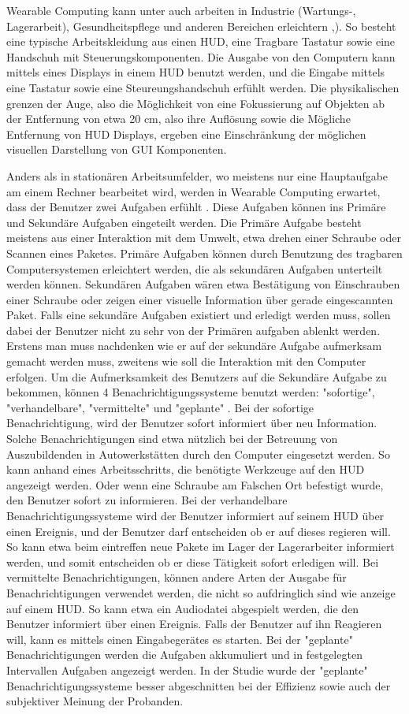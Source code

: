 Wearable Computing kann unter auch arbeiten in Industrie (Wartungs-, Lagerarbeit), Gesundheitspflege und anderen Bereichen erleichtern \cite{Witt:2006hi},\cite{Lawo:2008gg}). So besteht eine typische Arbeitskleidung aus einen HUD, eine Tragbare Tastatur sowie eine Handschuh mit Steuerungskomponenten. Die Ausgabe von den Computern kann mittels eines Displays in einem HUD benutzt werden, und die Eingabe mittels eine Tastatur sowie eine Steureungshandschuh erfühlt werden. Die physikalischen grenzen der Auge, also die Möglichkeit von eine Fokussierung auf Objekten ab der Entfernung von etwa 20 cm, also ihre Auflösung sowie die Mögliche Entfernung von HUD Displays, ergeben eine Einschränkung der möglichen visuellen Darstellung von GUI Komponenten. 

Anders als in stationären Arbeitsumfelder, wo meistens nur eine Hauptaufgabe am einem Rechner bearbeitet wird, werden in Wearable Computing erwartet, dass der Benutzer zwei Aufgaben erfühlt \cite{Witt:2006hi}. Diese Aufgaben können ins Primäre und Sekundäre Aufgaben eingeteilt werden. Die Primäre Aufgabe besteht meistens aus einer Interaktion mit dem Umwelt, etwa drehen einer Schraube oder Scannen eines Paketes. Primäre Aufgaben können durch Benutzung des tragbaren Computersystemen erleichtert werden, die als sekundären Aufgaben unterteilt werden können. Sekundären Aufgaben wären etwa Bestätigung von Einschrauben einer Schraube oder zeigen einer visuelle Information über gerade eingescannten Paket. Falls eine sekundäre Aufgaben existiert und erledigt werden muss, sollen dabei der Benutzer nicht zu sehr von der Primären aufgaben ablenkt werden. Erstens man muss nachdenken wie er auf der sekundäre Aufgabe aufmerksam gemacht werden muss, zweitens wie soll die Interaktion mit den Computer erfolgen. Um die Aufmerksamkeit des Benutzers auf die Sekundäre Aufgabe zu bekommen, können 4 Benachrichtigungssysteme benutzt werden: "sofortige", "verhandelbare", "vermittelte" und "geplante" \cite{McFarlane:1999um}\cite{Nilsson:cq}. Bei der sofortige Benachrichtigung, wird der Benutzer sofort informiert über neu Information. Solche Benachrichtigungen sind etwa nützlich bei der Betreuung von Auszubildenden in Autowerkstätten durch den Computer eingesetzt werden. So kann anhand eines Arbeitsschritts, die benötigte Werkzeuge auf den HUD angezeigt werden. Oder wenn eine Schraube am Falschen Ort befestigt wurde, den Benutzer sofort zu informieren. Bei der verhandelbare Benachrichtigungssysteme wird der Benutzer informiert auf seinem HUD über einen Ereignis, und der Benutzer darf entscheiden ob er auf dieses regieren will. So kann etwa beim eintreffen neue Pakete im Lager der Lagerarbeiter informiert werden, und somit entscheiden ob er diese Tätigkeit sofort erledigen will. Bei vermittelte Benachrichtigungen, können andere Arten der Ausgabe für Benachrichtigungen verwendet werden, die nicht so aufdringlich sind wie anzeige auf einem HUD. So kann etwa ein Audiodatei abgespielt werden, die den Benutzer informiert über einen Ereignis. Falls der Benutzer auf ihn Reagieren will, kann es mittels einen Eingabegerätes es starten. Bei der "geplante" Benachrichtigungen werden die Aufgaben  akkumuliert und in festgelegten Intervallen Aufgaben angezeigt werden. In der Studie \cite{Nilsson:cq} wurde der "geplante" Benachrichtigungssysteme besser abgeschnitten bei der Effizienz sowie auch der subjektiver Meinung der Probanden.